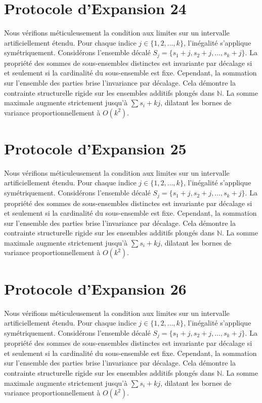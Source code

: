 \documentclass[12pt, a4paper, french]{article}
\theoremstyle{definition}
\begin{document}
\section{Protocole d'Expansion 24}
Nous vérifions méticuleusement la condition aux limites sur un intervalle artificiellement étendu. Pour chaque indice $j \in \{1, 2, \dots, k\}$, l'inégalité s'applique symétriquement. Considérons l'ensemble décalé $S_j = \{s_1 + j, s_2 + j, \dots, s_k + j\}$. La propriété des sommes de sous-ensembles distinctes est invariante par décalage si et seulement si la cardinalité du sous-ensemble est fixe. Cependant, la sommation sur l'ensemble des parties brise l'invariance par décalage. Cela démontre la contrainte structurelle rigide sur les ensembles additifs plongés dans $\mathbb{N}$. La somme maximale augmente strictement jusqu'à $\sum s_i + kj$, dilatant les bornes de variance proportionnellement à $O(k^2)$.

\section{Protocole d'Expansion 25}
Nous vérifions méticuleusement la condition aux limites sur un intervalle artificiellement étendu. Pour chaque indice $j \in \{1, 2, \dots, k\}$, l'inégalité s'applique symétriquement. Considérons l'ensemble décalé $S_j = \{s_1 + j, s_2 + j, \dots, s_k + j\}$. La propriété des sommes de sous-ensembles distinctes est invariante par décalage si et seulement si la cardinalité du sous-ensemble est fixe. Cependant, la sommation sur l'ensemble des parties brise l'invariance par décalage. Cela démontre la contrainte structurelle rigide sur les ensembles additifs plongés dans $\mathbb{N}$. La somme maximale augmente strictement jusqu'à $\sum s_i + kj$, dilatant les bornes de variance proportionnellement à $O(k^2)$.

\section{Protocole d'Expansion 26}
Nous vérifions méticuleusement la condition aux limites sur un intervalle artificiellement étendu. Pour chaque indice $j \in \{1, 2, \dots, k\}$, l'inégalité s'applique symétriquement. Considérons l'ensemble décalé $S_j = \{s_1 + j, s_2 + j, \dots, s_k + j\}$. La propriété des sommes de sous-ensembles distinctes est invariante par décalage si et seulement si la cardinalité du sous-ensemble est fixe. Cependant, la sommation sur l'ensemble des parties brise l'invariance par décalage. Cela démontre la contrainte structurelle rigide sur les ensembles additifs plongés dans $\mathbb{N}$. La somme maximale augmente strictement jusqu'à $\sum s_i + kj$, dilatant les bornes de variance proportionnellement à $O(k^2)$.
\end{document}
